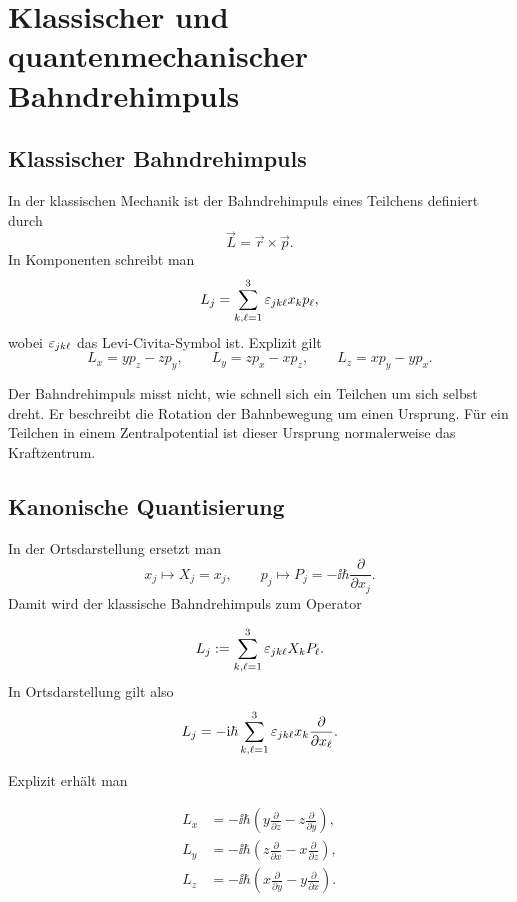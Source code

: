 \section{Klassischer und quantenmechanischer Bahndrehimpuls}

\subsection{Klassischer Bahndrehimpuls}

In der klassischen Mechanik ist der Bahndrehimpuls eines Teilchens definiert durch
\[
    \vec L = \vec r \times \vec p.
\]
In Komponenten schreibt man
\[
    L_j = \sum_{k,\ell=1}^3 \varepsilon_{jk\ell} x_k p_\ell,
\]
wobei \(\varepsilon_{jk\ell}\) das Levi-Civita-Symbol ist. Explizit gilt
\[
    L_x = y p_z - z p_y,
    \qquad
    L_y = z p_x - x p_z,
    \qquad
    L_z = x p_y - y p_x.
\]

\begin{notebox}
Der Bahndrehimpuls misst nicht, wie schnell sich ein Teilchen um sich selbst dreht. Er beschreibt die Rotation der Bahnbewegung um einen Ursprung. Für ein Teilchen in einem Zentralpotential ist dieser Ursprung normalerweise das Kraftzentrum.
\end{notebox}

\subsection{Kanonische Quantisierung}

In der Ortsdarstellung ersetzt man
\[
    x_j \mapsto X_j=x_j,
    \qquad
    p_j \mapsto P_j=-\ii\hbar\frac{\partial}{\partial x_j}.
\]
Damit wird der klassische Bahndrehimpuls zum Operator
\begin{definitionbox}
\[
    L_j := \sum_{k,\ell=1}^3 \varepsilon_{jk\ell} X_k P_\ell.
\]
In Ortsdarstellung gilt also
\[
    L_j = -\mathrm{i}\hbar\sum_{k,\ell=1}^3 \varepsilon_{jk\ell}x_k\frac{\partial}{\partial x_\ell}.
\]
\end{definitionbox}

Explizit erhält man
\begin{formulabox}
\[
\begin{aligned}
    L_x &= -\ii\hbar\left(y\frac{\partial}{\partial z}-z\frac{\partial}{\partial y}\right),\\
    L_y &= -\ii\hbar\left(z\frac{\partial}{\partial x}-x\frac{\partial}{\partial z}\right),\\
    L_z &= -\ii\hbar\left(x\frac{\partial}{\partial y}-y\frac{\partial}{\partial x}\right).
\end{aligned}
\]
\end{formulabox}

